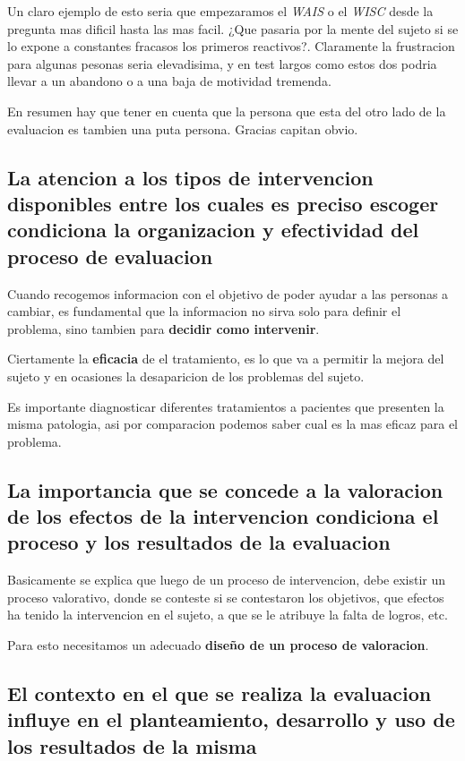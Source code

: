 \documentclass[12pt,a4paper]{article}
\begin{document}
Un claro ejemplo de esto seria que empezaramos el \textit{WAIS} o el \textit{WISC} desde la pregunta mas dificil hasta las mas facil. ¿Que pasaria por la mente del sujeto si se lo expone a constantes fracasos los primeros reactivos?. Claramente la frustracion para algunas pesonas seria elevadisima, y en test largos como estos dos podria llevar a un abandono o a una baja de motividad tremenda. 

En resumen hay que tener en cuenta que la persona que esta del otro lado de la evaluacion es tambien una puta persona. Gracias capitan obvio. 

\subsection{La atencion a los tipos de intervencion disponibles entre los cuales es preciso escoger condiciona la organizacion y efectividad del proceso de evaluacion}%

Cuando recogemos informacion con el objetivo de poder ayudar a las personas a cambiar, es fundamental que la informacion no sirva solo para definir el problema, sino tambien para \textbf{decidir como intervenir}.  

Ciertamente la \textbf{eficacia} de el tratamiento, es lo que va a permitir la mejora del sujeto y en ocasiones la desaparicion de los problemas del sujeto. 

Es importante diagnosticar diferentes tratamientos a pacientes que presenten la misma patologia, asi por comparacion podemos saber cual es la mas eficaz para el problema.

\subsection{La importancia que se concede a la valoracion de los efectos de la intervencion condiciona el proceso y los resultados de la evaluacion}%

Basicamente se explica que luego de un proceso de intervencion, debe existir un proceso valorativo, donde se conteste si se contestaron los objetivos, que efectos ha tenido la intervencion en el sujeto, a que se le atribuye la falta de logros, etc. 

Para esto necesitamos un adecuado \textbf{diseño de un proceso de valoracion}. 

\subsection{El contexto en el que se realiza la evaluacion influye en el planteamiento, desarrollo y uso de los resultados de la misma}%
\end{document}
